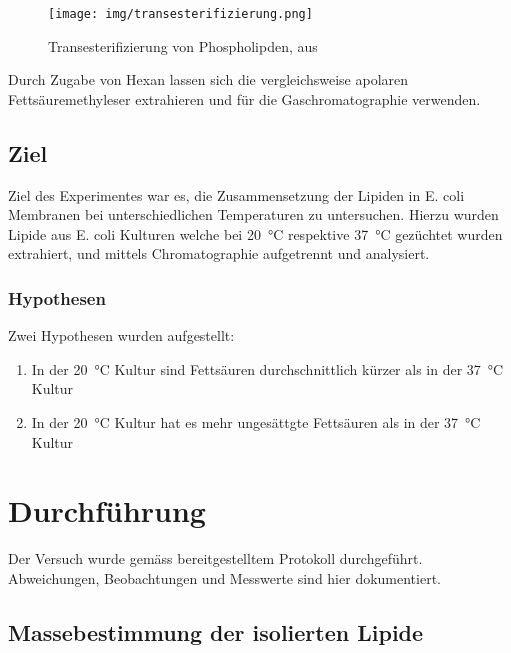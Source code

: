 \documentclass[a4paper,english]{scrreprt}
\begin{document}
\begin{figure}
	\centering
	\texttt{[image: img/transesterifizierung.png]}
	\caption{Transesterifizierung von Phospholipden, aus \cite{handoutv11}}
	\label{fig:transesterifizierung}
\end{figure}

Durch Zugabe von Hexan lassen sich die vergleichsweise apolaren
Fettsäuremethyleser extrahieren und für die Gaschromatographie verwenden.

\section{Ziel}

Ziel des Experimentes war es, die Zusammensetzung der Lipiden in E. coli
Membranen bei unterschiedlichen Temperaturen zu untersuchen. Hierzu wurden
Lipide aus E. coli Kulturen welche bei \SI{20}{\celsius} respektive
\SI{37}{\celsius} gezüchtet wurden extrahiert, und mittels Chromatographie
aufgetrennt und analysiert.

\subsection{Hypothesen}


Zwei Hypothesen wurden aufgestellt:
\begin{enumerate}
	\item In der \SI{20}{\celsius} Kultur sind Fettsäuren durchschnittlich
		kürzer als in der \SI{37}{\celsius} Kultur
	\item In der \SI{20}{\celsius} Kultur hat es mehr ungesättgte
		Fettsäuren als in der \SI{37}{\celsius} Kultur
\end{enumerate}

\chapter{Durchführung}


Der Versuch wurde gemäss bereitgestelltem Protokoll \cite{skriptv11}
durchgeführt. Abweichungen, Beobachtungen und Messwerte sind hier dokumentiert.

\section{Massebestimmung der isolierten Lipide}
\end{document}
